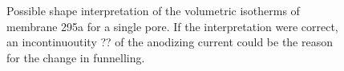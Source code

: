 \documentclass[../../thesis.tex]{subfiles}
\begin{document}
\begin{figure}[ht]
    \centering
    \caption{Possible shape interpretation of the volumetric isotherms of membrane 295a for a single pore. If the interpretation were correct, an incontinuoutity ?? of the anodizing current could be the reason for the change in funnelling.}
    \label{fig:weird-funnelling}
\end{figure}
\end{document}
